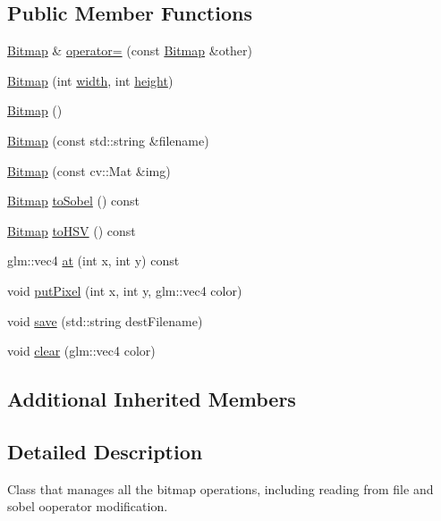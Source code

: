 \subsection*{Public Member Functions}
\begin{DoxyCompactItemize}
\item 
\hyperlink{class_bitmap}{Bitmap} \& \hyperlink{class_bitmap_a7a1a9969ca533d4adebe7c44a26ee092}{operator=} (const \hyperlink{class_bitmap}{Bitmap} \&other)
\item 
\hyperlink{class_bitmap_a40526748415c8bbc58a8510d636c20f4}{Bitmap} (int \hyperlink{class_render_context_a8009663c022d4a60d8a4dbfdb4183f46}{width}, int \hyperlink{class_render_context_a194a36ce3d85ae9ef5b40396e1e2d950}{height})
\item 
\hyperlink{class_bitmap_aa6ef6d8c0b66664350ef4dd062db3aec}{Bitmap} ()
\item 
\hyperlink{class_bitmap_a5a26ccbab9af0b40421eacc21e75536d}{Bitmap} (const std\+::string \&filename)
\item 
\hyperlink{class_bitmap_a5614426bc7923697c1d1f35e04a37c3c}{Bitmap} (const cv\+::\+Mat \&img)
\item 
\hyperlink{class_bitmap}{Bitmap} \hyperlink{class_bitmap_a99d5b69de318e80c9af1f660f46c00c4}{to\+Sobel} () const 
\item 
\hyperlink{class_bitmap}{Bitmap} \hyperlink{class_bitmap_a80c5adbea91bb7311008dab576dc82c6}{to\+H\+S\+V} () const 
\item 
glm\+::vec4 \hyperlink{class_bitmap_af5c0948748aa68b2737871d20201c2e5}{at} (int x, int y) const 
\item 
void \hyperlink{class_bitmap_a6f880db00f7d05e6284005a6553aa17c}{put\+Pixel} (int x, int y, glm\+::vec4 color)
\item 
void \hyperlink{class_bitmap_a9ca33640e5554ee36b435fa789260903}{save} (std\+::string dest\+Filename)
\item 
void \hyperlink{class_bitmap_a409022ea446f41edcce42c076dff1608}{clear} (glm\+::vec4 color)
\end{DoxyCompactItemize}
\subsection*{Additional Inherited Members}


\subsection{Detailed Description}
Class that manages all the bitmap operations, including reading from file and sobel ooperator modification. 

